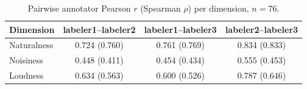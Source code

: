 \begin{table}[t]
\centering
\caption{Pairwise annotator Pearson $r$ (Spearman $\rho$) per dimension, $n{=}76$.}
\label{tab:iaa-pairwise}
\begin{tabular}{lccc}
\toprule
Dimension & labeler1--labeler2 & labeler1--labeler3 & labeler2--labeler3 \\
\midrule
Naturalness & 0.724 (0.760) & 0.761 (0.769) & 0.834 (0.833) \\
Noisiness & 0.448 (0.411) & 0.454 (0.434) & 0.555 (0.453) \\
Loudness & 0.634 (0.563) & 0.600 (0.526) & 0.787 (0.646) \\
\bottomrule
\end{tabular}
\end{table}